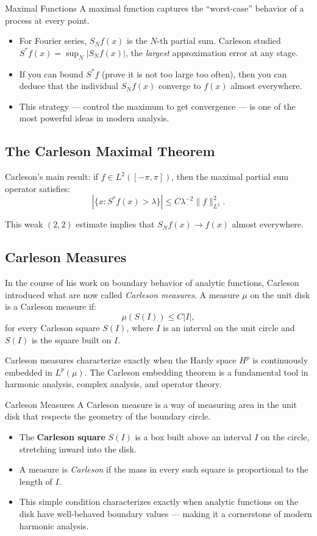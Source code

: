 \begin{primer}{Maximal Functions}
A maximal function captures the ``worst-case'' behavior of a process at every point.
\begin{itemize}
    \item For Fourier series, $S_N f(x)$ is the $N$-th partial sum. Carleson studied $S^* f(x) = \sup_N |S_N f(x)|$, the \emph{largest} approximation error at any stage.
    \item If you can bound $S^* f$ (prove it is not too large too often), then you can deduce that the individual $S_N f(x)$ converge to $f(x)$ almost everywhere.
    \item This strategy --- control the maximum to get convergence --- is one of the most powerful ideas in modern analysis.
\end{itemize}
\end{primer}

\subsection{The Carleson Maximal Theorem}

Carleson's main result: if $f \in L^2([-\pi, \pi])$, then the maximal partial sum operator satisfies:
\[
|\{x : S^* f(x) > \lambda\}| \leq C \lambda^{-2} \|f\|_{L^2}^2.
\]

This weak $(2,2)$ estimate implies that $S_N f(x) \to f(x)$ almost everywhere.

\subsection{Carleson Measures}

In the course of his work on boundary behavior of analytic functions, Carleson introduced what are now called \emph{Carleson measures}. A measure $\mu$ on the unit disk is a Carleson measure if:
\[
\mu(S(I)) \leq C|I|, 
\]
for every Carleson square $S(I)$, where $I$ is an interval on the unit circle and $S(I)$ is the square built on $I$.

Carleson measures characterize exactly when the Hardy space $H^p$ is continuously embedded in $L^p(\mu)$. The Carleson embedding theorem is a fundamental tool in harmonic analysis, complex analysis, and operator theory.

\begin{knowledgebridge}{Carleson Measures}
A Carleson measure is a way of measuring area in the unit disk that respects the geometry of the boundary circle.
\begin{itemize}
    \item The \textbf{Carleson square} $S(I)$ is a box built above an interval $I$ on the circle, stretching inward into the disk.
    \item A measure is \emph{Carleson} if the mass in every such square is proportional to the length of $I$.
    \item This simple condition characterizes exactly when analytic functions on the disk have well-behaved boundary values --- making it a cornerstone of modern harmonic analysis.
\end{itemize}
\end{knowledgebridge}

